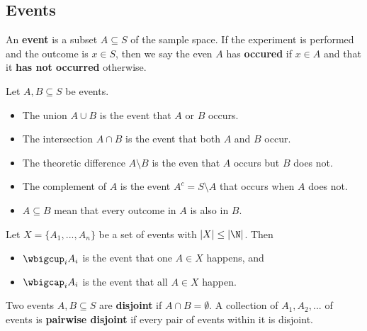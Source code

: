 \documentclass{article}
\begin{document}
\subsection{Events}
\begin{definition}
    An \textbf{event} is a subset $A\subseteq S$ of the sample space. If the experiment is performed and the
    outcome is $x\in S$, then we say the even $A$ has \textbf{occured} if $x\in A$ and that it \textbf{has not occurred}
    otherwise.
\end{definition}
\begin{theorem}
    Let $A,B\subseteq S$ be events.
    \begin{itemize}
        \item The union $A\cup B$ is the event that $A$ or $B$ occurs.
        \item The intersection $A\cap B$ is the event that both $A$ and $B$ occur.
        \item The theoretic difference $A\setminus B$ is the even that $A$ occurs but $B$ does not.
        \item The complement of $A$ is the event $A^c=S\setminus A$ that occurs when $A$ does not.
        \item $A\subseteq B$ mean that every outcome in $A$ is also in $B$.
    \end{itemize}
\end{theorem}
\begin{definition}
    Let $X=\{A_1, ..., A_n\}$ be a set of events with $|X|\leq |\N|$. Then 
    \begin{itemize}
        \item $\wbigcup_i A_i$ is the event that one $A\in X$ happens, and
        \item $\wbigcap_i A_i$ is the event that all $A\in X$ happen.
    \end{itemize}
\end{definition}
\begin{definition}
    Two events $A,B\subseteq S$ are \textbf{disjoint} if $A\cap B=\emptyset$. 
    A collection of $A_1, A_2,...$ of events is \textbf{pairwise disjoint} if every pair of
    events within it is disjoint.
\end{definition}
\end{document}
